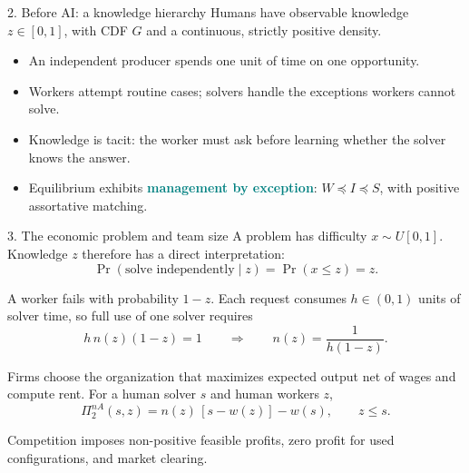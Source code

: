 \documentclass[aspectratio=169,11pt]{beamer}
\newcommand{\key}[1]{\textcolor{teal}{\textbf{#1}}}
\begin{document}
\begin{frame}{2. Before AI: a knowledge hierarchy}
  Humans have observable knowledge $z\in[0,1]$, with CDF $G$ and a continuous, strictly positive density.

  \medskip
  \begin{center}
  \end{center}

  \begin{itemize}\small
    \item An independent producer spends one unit of time on one opportunity.
    \item Workers attempt routine cases; solvers handle the exceptions workers cannot solve.
    \item Knowledge is tacit: the worker must ask before learning whether the solver knows the answer.
    \item Equilibrium exhibits \key{management by exception}: $W\preceq I\preceq S$, with positive assortative matching.
  \end{itemize}
\end{frame}

\begin{frame}{3. The economic problem and team size}
  A problem has difficulty $x\sim U[0,1]$. Knowledge $z$ therefore has a direct interpretation:
  \[
    \Pr(\text{solve independently}\mid z)=\Pr(x\le z)=z.
  \]

  A worker fails with probability $1-z$. Each request consumes $h\in(0,1)$ units of solver time, so full use of one solver requires
  \[
    h\,n(z)(1-z)=1
    \qquad\Longrightarrow\qquad
    \boxed{n(z)=\frac{1}{h(1-z)}}.
  \]

  Firms choose the organization that maximizes expected output net of wages and compute rent. For a human solver $s$ and human workers $z$,
  \[
    \Pi^{nA}_2(s,z)=n(z)\,[s-w(z)]-w(s),\qquad z\le s.
  \]

  \smallskip
  \centering
  Competition imposes non-positive feasible profits, zero profit for used configurations, and market clearing.
\end{frame}
\end{document}
